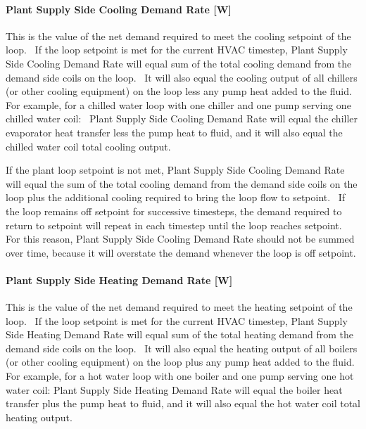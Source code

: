 \paragraph{Plant Supply Side Cooling Demand Rate {[}W{]}}\label{plant-supply-side-cooling-demand-rate-w}

This is the value of the net demand required to meet the cooling setpoint of the loop.~ If the loop setpoint is met for the current HVAC timestep, Plant Supply Side Cooling Demand Rate will equal sum of the total cooling demand from the demand side coils on the loop.~ It will also equal the cooling output of all chillers (or other cooling equipment) on the loop less any pump heat added to the fluid.~ For example, for a chilled water loop with one chiller and one pump serving one chilled water coil:~ Plant Supply Side Cooling Demand Rate will equal the chiller evaporator heat transfer less the pump heat to fluid, and it will also equal the chilled water coil total cooling output.

If the plant loop setpoint is not met, Plant Supply Side Cooling Demand Rate will equal the sum of the total cooling demand from the demand side coils on the loop plus the additional cooling required to bring the loop flow to setpoint.~ If the loop remains off setpoint for successive timesteps, the demand required to return to setpoint will repeat in each timestep until the loop reaches setpoint.~ For this reason, Plant Supply Side Cooling Demand Rate should not be summed over time, because it will overstate the demand whenever the loop is off setpoint.

\paragraph{Plant Supply Side Heating Demand Rate {[}W{]}}\label{plant-supply-side-heating-demand-rate-w}

This is the value of the net demand required to meet the heating setpoint of the loop.~ If the loop setpoint is met for the current HVAC timestep, Plant Supply Side Heating Demand Rate will equal sum of the total heating demand from the demand side coils on the loop.~ It will also equal the heating output of all boilers (or other cooling equipment) on the loop plus any pump heat added to the fluid.~ For example, for a hot water loop with one boiler and one pump serving one hot water coil: Plant Supply Side Heating Demand Rate will equal the boiler heat transfer plus the pump heat to fluid, and it will also equal the hot water coil total heating output.


